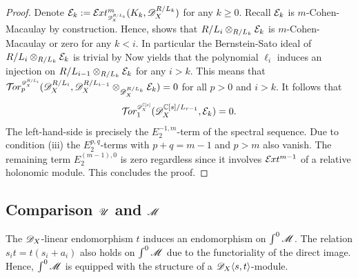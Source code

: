 \begin{proof}
  Denote $\E_{k}:= \Ex{\D_X^{R/L_{k}} }{m}(K_k, \D_X^{R/L_k})$ for any $k\geq 0$.
  Recall $\mathcal{E}_k$ is $m$-Cohen-Macaulay by construction.
  Hence,  shows that $R/L_i\otimes_{R/L_k}\mathcal{E}_{k}$ is $m$-Cohen-Macaulay or zero for any $k<i$.
  In particular the Bernstein-Sato ideal of $R/L_i\otimes_{R/L_k}\mathcal{E}_{k}$ is trivial by 
  Now  yields that the polynomial $\ell_i$ induces an injection on $R/L_{i-1} \otimes_{R/L_k}\mathcal{E}_k$ for any $i>k$.
  This means that $\Tr{\D_X^{R/L_i}}{p}(\D_X^{R/L_i},\D_X^{R/L_{i-1}}\otimes_{\D_X^{R/L_k}} \E_k ) = 0$ for all $p> 0$ and $i> k$.
  It follows that
  $$ \Tr{\D_X^{\C[s]}}{1} (\D_X^{\C[s]/L_{r-1}},\E_k ) = 0.$$
  The left-hand-side is precisely the $E^{-1,m}_2$-term of the spectral sequence.
  Due to condition (iii) the $E^{p,q}_2$-terms with $p+q = m -1$ and $p>m$ also vanish.
  The remaining term $E^{(m -1),0}_2$ is zero regardless since it involves $\mathcal{E}\mkern -1mu xt^{m - 1}$ of a relative holonomic module.
  This concludes the proof.
\end{proof}

\subsection{Comparison $\mathscr{U}$ and $\mathscr{M}$}
  The $\mathscr{D}_X$-linear endomorphism $t$ induces an endomorphism on $\int^0\mathscr{M}$.
  The relation $s_it = t(s_i +a_i)$ also holds on $\int^0\mathscr{M}$ due to the functoriality of the direct image.
  Hence, $\int^0\mathscr{M}$ is equipped with the structure of a $\mathscr{D}_X\langle s,t\rangle$-module.

